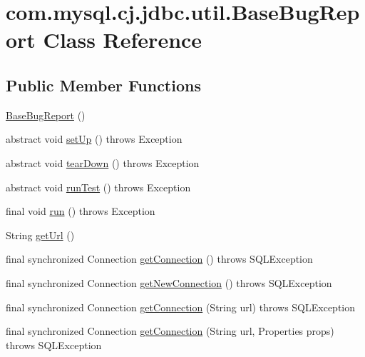 \hypertarget{classcom_1_1mysql_1_1cj_1_1jdbc_1_1util_1_1_base_bug_report}{}\section{com.\+mysql.\+cj.\+jdbc.\+util.\+Base\+Bug\+Report Class Reference}
\label{classcom_1_1mysql_1_1cj_1_1jdbc_1_1util_1_1_base_bug_report}
\subsection*{Public Member Functions}
\begin{DoxyCompactItemize}
\item 
\mbox{\hyperlink{classcom_1_1mysql_1_1cj_1_1jdbc_1_1util_1_1_base_bug_report_ab1f1c9976f81472afdb89476bf540830}{Base\+Bug\+Report}} ()
\item 
abstract void \mbox{\hyperlink{classcom_1_1mysql_1_1cj_1_1jdbc_1_1util_1_1_base_bug_report_ad320a1b51efdb6c84a11050708d59d51}{set\+Up}} ()  throws Exception
\item 
abstract void \mbox{\hyperlink{classcom_1_1mysql_1_1cj_1_1jdbc_1_1util_1_1_base_bug_report_a425288fa4310585fc86c736ec94e8033}{tear\+Down}} ()  throws Exception
\item 
abstract void \mbox{\hyperlink{classcom_1_1mysql_1_1cj_1_1jdbc_1_1util_1_1_base_bug_report_ac3abccb9a116e7fadc6087927166909c}{run\+Test}} ()  throws Exception
\item 
final void \mbox{\hyperlink{classcom_1_1mysql_1_1cj_1_1jdbc_1_1util_1_1_base_bug_report_aa9c59d5f6ff687784bd96bebd5e3dc87}{run}} ()  throws Exception 
\item 
String \mbox{\hyperlink{classcom_1_1mysql_1_1cj_1_1jdbc_1_1util_1_1_base_bug_report_af253a8d960912715ba0cc0fe1766c4d6}{get\+Url}} ()
\item 
final synchronized Connection \mbox{\hyperlink{classcom_1_1mysql_1_1cj_1_1jdbc_1_1util_1_1_base_bug_report_aef144ede71b00b26e1435e42314192c9}{get\+Connection}} ()  throws S\+Q\+L\+Exception 
\item 
final synchronized Connection \mbox{\hyperlink{classcom_1_1mysql_1_1cj_1_1jdbc_1_1util_1_1_base_bug_report_a52dfde9282d44dc1b96c28bb0d08f731}{get\+New\+Connection}} ()  throws S\+Q\+L\+Exception 
\item 
final synchronized Connection \mbox{\hyperlink{classcom_1_1mysql_1_1cj_1_1jdbc_1_1util_1_1_base_bug_report_a0bd5313cdb5db035162bf6ad01a1f507}{get\+Connection}} (String url)  throws S\+Q\+L\+Exception 
\item 
final synchronized Connection \mbox{\hyperlink{classcom_1_1mysql_1_1cj_1_1jdbc_1_1util_1_1_base_bug_report_a6eea476d9a67e9c328c88541f7a11ca3}{get\+Connection}} (String url, Properties props)  throws S\+Q\+L\+Exception 
\end{DoxyCompactItemize}
